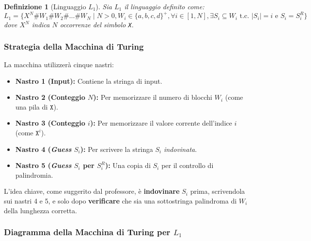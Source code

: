 \documentclass[a4paper]{article}
\newtheorem{definition}{Definizione}
\newcommand{\Sh}{\texttt{\#}} %
\newcommand{\X}{\texttt{X}} %
\begin{document}
\begin{definition}[Linguaggio $L_1$]
Sia $L_1$ il linguaggio definito come:
\[
L_1 = \{ X^N \Sh W_1 \Sh W_2 \Sh \dots \Sh W_N \mid N > 0, W_i \in \{a,b,c,d\}^+, \forall i \in [1, N], \exists S_i \subseteq W_i \text{ t.c. } |S_i| = i \text{ e } S_i = S_i^R \}
\]
dove $X^N$ indica $N$ occorrenze del simbolo \texttt{X}.
\end{definition}

\subsubsection{Strategia della Macchina di Turing}
La macchina utilizzerà cinque nastri:
\begin{itemize}
    \item \textbf{Nastro 1 (Input):} Contiene la stringa di input.
    \item \textbf{Nastro 2 (Conteggio $N$):} Per memorizzare il numero di blocchi $W_i$ (come una pila di $\X$).
    \item \textbf{Nastro 3 (Conteggio $i$):} Per memorizzare il valore corrente dell'indice $i$ (come $\X^i$).
    \item \textbf{Nastro 4 (\textit{Guess} $S_i$):} Per scrivere la stringa $S_i$ \textit{indovinata}.
    \item \textbf{Nastro 5 (\textit{Guess} $S_i$ per $S_i^R$):} Una copia di $S_i$ per il controllo di palindromia.
\end{itemize}
L'idea chiave, come suggerito dal professore, è \textbf{indovinare} $S_i$ prima, scrivendola sui nastri 4 e 5, e solo dopo \textbf{verificare} che sia una sottostringa palindroma di $W_i$ della lunghezza corretta.

\subsubsection{Diagramma della Macchina di Turing per $L_1$}
\end{document}
